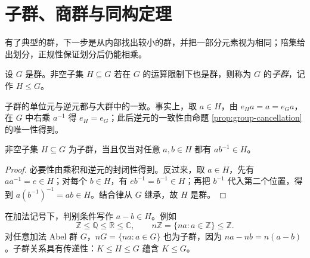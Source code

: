 \documentclass[lang=cn,a4paper,fontset=none,zihao=false,10pt,openany,twoside]{beautybook}
\numberwithin{algorithm}{chapter}
\begin{document}
\section{子群、商群与同构定理}\label{sec:group-quotients}
有了典型的群，下一步是从内部找出较小的群，并把一部分元素视为相同；陪集给出划分，正规性保证划分后仍能相乘。
\begin{definition}[子群]
设 $G$ 是群。非空子集 $H\subseteq G$ 若在 $G$ 的运算限制下也是群，则称为 $G$ 的\emph{子群}，记作 $H\le G$。
\end{definition}
子群的单位元与逆元都与大群中的一致。事实上，取 $a\in H$，由 $e_Ha=a=e_Ga$，在 $G$ 中右乘 $a^{-1}$ 得 $e_H=e_G$；此后逆元的一致性由命题 \ref{prop:group-cancellation} 的唯一性得到。
\begin{proposition}[子群判别法]\label{prop:subgroup-test}
非空子集 $H\subseteq G$ 为子群，当且仅当对任意 $a,b\in H$ 都有 $ab^{-1}\in H$。
\end{proposition}
\begin{proof}
必要性由乘积和逆元的封闭性得到。反过来，取 $a\in H$，先有 $aa^{-1}=e\in H$；对每个 $b\in H$，有 $eb^{-1}=b^{-1}\in H$；再把 $b^{-1}$ 代入第二个位置，得到 $a(b^{-1})^{-1}=ab\in H$。结合律从 $G$ 继承，故 $H$ 是群。
\end{proof}
在加法记号下，判别条件写作 $a-b\in H$。例如
\[
 \mathbb Z\le\mathbb Q\le\mathbb R\le\mathbb C,
 \qquad n\mathbb Z=\{na:a\in\mathbb Z\}\le\mathbb Z.
\]
对任意加法 Abel 群 $G$，$nG=\{na:a\in G\}$ 也为子群，因为 $na-nb=n(a-b)$。子群关系具有传递性：$K\le H\le G$ 蕴含 $K\le G$。
\end{document}
